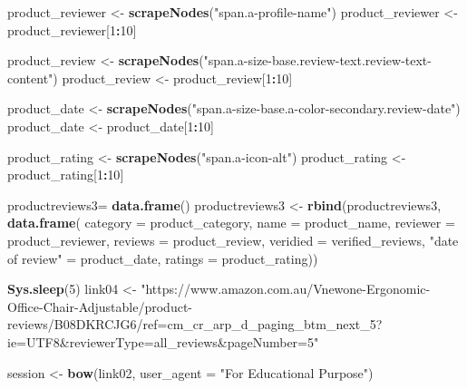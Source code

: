\documentclass[
]{article}
\newenvironment{Shaded}{\begin{snugshade}}{\end{snugshade}}
\newcommand{\AttributeTok}[1]{\textcolor[rgb]{0.13,0.29,0.53}{#1}}
\newcommand{\DecValTok}[1]{\textcolor[rgb]{0.00,0.00,0.81}{#1}}
\newcommand{\FunctionTok}[1]{\textcolor[rgb]{0.13,0.29,0.53}{\textbf{#1}}}
\newcommand{\NormalTok}[1]{#1}
\newcommand{\OtherTok}[1]{\textcolor[rgb]{0.56,0.35,0.01}{#1}}
\newcommand{\SpecialCharTok}[1]{\textcolor[rgb]{0.81,0.36,0.00}{\textbf{#1}}}
\newcommand{\StringTok}[1]{\textcolor[rgb]{0.31,0.60,0.02}{#1}}
\begin{document}
\begin{Shaded}
\begin{Highlighting}[]
\NormalTok{  product\_reviewer }\OtherTok{\textless{}{-}} \FunctionTok{scrapeNodes}\NormalTok{(}\StringTok{"span.a{-}profile{-}name"}\NormalTok{)}
\NormalTok{  product\_reviewer }\OtherTok{\textless{}{-}}\NormalTok{ product\_reviewer[}\DecValTok{1}\SpecialCharTok{:}\DecValTok{10}\NormalTok{]}
  
\NormalTok{  product\_review }\OtherTok{\textless{}{-}} \FunctionTok{scrapeNodes}\NormalTok{(}\StringTok{"span.a{-}size{-}base.review{-}text.review{-}text{-}content"}\NormalTok{)}
\NormalTok{  product\_review }\OtherTok{\textless{}{-}}\NormalTok{ product\_review[}\DecValTok{1}\SpecialCharTok{:}\DecValTok{10}\NormalTok{]}
  
\NormalTok{  product\_date }\OtherTok{\textless{}{-}} \FunctionTok{scrapeNodes}\NormalTok{(}\StringTok{"span.a{-}size{-}base.a{-}color{-}secondary.review{-}date"}\NormalTok{)}
\NormalTok{  product\_date }\OtherTok{\textless{}{-}}\NormalTok{ product\_date[}\DecValTok{1}\SpecialCharTok{:}\DecValTok{10}\NormalTok{]}
  
\NormalTok{  product\_rating }\OtherTok{\textless{}{-}} \FunctionTok{scrapeNodes}\NormalTok{(}\StringTok{"span.a{-}icon{-}alt"}\NormalTok{)}
\NormalTok{  product\_rating }\OtherTok{\textless{}{-}}\NormalTok{ product\_rating[}\DecValTok{1}\SpecialCharTok{:}\DecValTok{10}\NormalTok{]}
  
\NormalTok{  productreviews3}\OtherTok{=} \FunctionTok{data.frame}\NormalTok{()}
\NormalTok{  productreviews3 }\OtherTok{\textless{}{-}} \FunctionTok{rbind}\NormalTok{(productreviews3, }\FunctionTok{data.frame}\NormalTok{(}
                      \AttributeTok{category =}\NormalTok{ product\_category,}
                      \AttributeTok{name =}\NormalTok{ product\_name,}
                      \AttributeTok{reviewer =}\NormalTok{ product\_reviewer,}
                      \AttributeTok{reviews =}\NormalTok{ product\_review,}
                      \AttributeTok{veridied =}\NormalTok{ verified\_reviews,}
                      \StringTok{"date of review"} \OtherTok{=}\NormalTok{ product\_date,}
                      \AttributeTok{ratings =}\NormalTok{ product\_rating))}
  
  \FunctionTok{Sys.sleep}\NormalTok{(}\DecValTok{5}\NormalTok{)}
\NormalTok{link04 }\OtherTok{\textless{}{-}} \StringTok{"https://www.amazon.com.au/Vnewone{-}Ergonomic{-}Office{-}Chair{-}Adjustable/product{-}reviews/B08DKRCJG6/ref=cm\_cr\_arp\_d\_paging\_btm\_next\_5?ie=UTF8\&reviewerType=all\_reviews\&pageNumber=5"}


\NormalTok{  session }\OtherTok{\textless{}{-}} \FunctionTok{bow}\NormalTok{(link02,}
               \AttributeTok{user\_agent =} \StringTok{"For Educational Purpose"}\NormalTok{)}


\end{Highlighting}
\end{Shaded}
\end{document}
